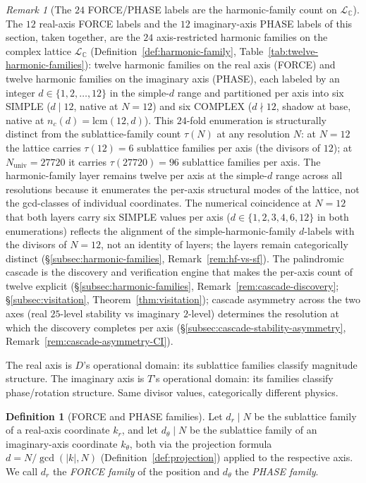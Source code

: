 \documentclass[11pt,a4paper]{article}
\theoremstyle{definition}
\newtheorem{definition}[theorem]{Definition}
\theoremstyle{remark}
\newtheorem{remark}[theorem]{Remark}
\newcommand{\C}{\mathbb{C}}
\begin{document}
\begin{remark}[The $24$ FORCE/PHASE labels are the harmonic-family count on $\mathcal{L}_{\C}$]\label{rem:24-is-hf}
The $12$ real-axis FORCE labels and the $12$ imaginary-axis PHASE labels of this section, taken together, are the $24$ axis-restricted harmonic families on the complex lattice $\mathcal{L}_{\C}$ (Definition~\ref{def:harmonic-family}, Table~\ref{tab:twelve-harmonic-families}): twelve harmonic families on the real axis (FORCE) and twelve harmonic families on the imaginary axis (PHASE), each labeled by an integer $d \in \{1,2,\ldots,12\}$ in the simple-$d$ range and partitioned per axis into six SIMPLE ($d \mid 12$, native at $N=12$) and six COMPLEX ($d \nmid 12$, shadow at base, native at $n_{c}(d) = \mathrm{lcm}(12,d)$). This $24$-fold enumeration is structurally distinct from the sublattice-family count $\tau(N)$ at any resolution $N$: at $N=12$ the lattice carries $\tau(12)=6$ sublattice families per axis (the divisors of $12$); at $N_{\text{univ}}=27720$ it carries $\tau(27720)=96$ sublattice families per axis. The harmonic-family layer remains twelve per axis at the simple-$d$ range across all resolutions because it enumerates the per-axis structural modes of the lattice, not the gcd-classes of individual coordinates. The numerical coincidence at $N=12$ that both layers carry six SIMPLE values per axis ($d \in \{1,2,3,4,6,12\}$ in both enumerations) reflects the alignment of the simple-harmonic-family $d$-labels with the divisors of $N=12$, not an identity of layers; the layers remain categorically distinct (\S\ref{subsec:harmonic-families}, Remark~\ref{rem:hf-vs-sf}). The palindromic cascade is the discovery and verification engine that makes the per-axis count of twelve explicit (\S\ref{subsec:harmonic-families}, Remark~\ref{rem:cascade-discovery}; \S\ref{subsec:visitation}, Theorem~\ref{thm:visitation}); cascade asymmetry across the two axes (real $25$-level stability vs imaginary $2$-level) determines the resolution at which the discovery completes per axis (\S\ref{subsec:cascade-stability-asymmetry}, Remark~\ref{rem:cascade-asymmetry-CI}).
\end{remark}

The real axis is $D$'s operational domain: its sublattice families classify magnitude structure. The imaginary axis is $T$'s operational domain: its families classify phase/rotation structure. Same divisor values, categorically different physics.

\begin{definition}[FORCE and PHASE families]\label{def:force-phase}
Let $d_{r} \mid N$ be the sublattice family of a real-axis coordinate $k_{r}$, and let $d_{\theta} \mid N$ be the sublattice family of an imaginary-axis coordinate $k_{\theta}$, both via the projection formula $d = N/\gcd(|k|,N)$ (Definition~\ref{def:projection}) applied to the respective axis. We call $d_{r}$ the \emph{FORCE family} of the position and $d_{\theta}$ the \emph{PHASE family}.
\end{definition}
\end{document}

